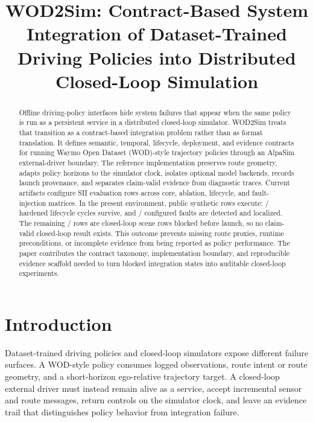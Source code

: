 \documentclass[conference,a4paper]{IEEEtran}
\title{WOD2Sim: Contract-Based System Integration of Dataset-Trained Driving Policies into Distributed Closed-Loop Simulation}
\author{
\IEEEauthorblockN{Alba Maria Tellez Fernandez}
\IEEEauthorblockA{Independent Researcher\\
Email: amtellezfernandez@gmail.com}
}
\begin{document}
\maketitle

\begin{abstract}
Offline driving-policy interfaces hide system failures that appear when the same policy is
run as a persistent service in a distributed closed-loop simulator. WOD2Sim treats that
transition as a contract-based integration problem rather than as format translation.
It defines semantic, temporal, lifecycle, deployment, and evidence contracts for running
Waymo Open Dataset (WOD)-style trajectory policies through an AlpaSim external-driver
boundary. The reference implementation preserves route geometry, adapts policy horizons
to the simulator clock, isolates optional model backends, records launch provenance, and
separates claim-valid evidence from diagnostic traces. Current artifacts configure
\SIITotalRows{} SII evaluation rows across core, ablation, lifecycle, and fault-injection
matrices. In the present environment, \SIISyntheticRuns{} public synthetic rows execute:
\SIILifecycleFullSurvived{}/\SIILifecycleFullTotal{} hardened lifecycle cycles survive,
and \SIIFaultLocalized{}/\SIIFaultTotal{} configured faults are detected and localized.
The remaining \SIIBlockedRuns{}/\SIITotalRows{} rows are closed-loop scene rows blocked
before launch, so no claim-valid closed-loop result exists. This outcome prevents missing
route proxies, runtime preconditions, or incomplete evidence from being reported as
policy performance. The paper contributes the contract taxonomy, implementation
boundary, and reproducible evidence scaffold needed to turn blocked integration states
into auditable closed-loop experiments.
\end{abstract}

\section{Introduction}

Dataset-trained driving policies and closed-loop simulators expose different failure
surfaces. A WOD-style policy consumes logged observations, route intent or route
geometry, and a short-horizon ego-relative trajectory target. A closed-loop external
driver must instead remain alive as a service, accept incremental sensor and route
messages, return controls on the simulator clock, and leave an evidence trail that
distinguishes policy behavior from integration failure.
\end{document}
